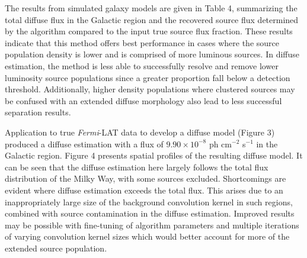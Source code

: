 \documentclass{PoS}
\begin{document}
The results from simulated galaxy models are given in Table 4, summarizing the total diffuse flux in the Galactic region and the recovered source flux determined by the algorithm compared to the input true source flux fraction. These results indicate that this method offers best performance in cases where the source population density is lower and is comprised of more luminous sources. In diffuse estimation, the method is less able to successfully resolve and remove lower luminosity source populations since a greater proportion fall below a detection threshold. Additionally, higher density populations where clustered sources may be confused with an extended diffuse morphology also lead to less successful separation results.

\begin{table}
\centering
{}
\makeatletter
\def\@captype{table}
\makeatother
\caption{Galactic Plane recovered diffuse fluxes}
\end{table}

Application to true \textit{Fermi}-LAT data to develop a diffuse model (Figure 3) produced a diffuse estimation with a flux of $9.90 \times 10^{-8}$ ph cm$^{-2}$ s$^{-1}$ in the Galactic region. Figure 4 presents spatial profiles of the resulting diffuse model. It can be seen that the diffuse estimation here largely follows the total flux distribution of the Milky Way, with some sources excluded. Shortcomings are evident where diffuse estimation exceeds the total flux. This arises due to an inappropriately large size of the background convolution kernel in such regions, combined with source contamination in the diffuse estimation. Improved results may be possible with fine-tuning of algorithm parameters and multiple iterations of varying convolution kernel sizes which would better account for more of the extended source population.
\end{document}
